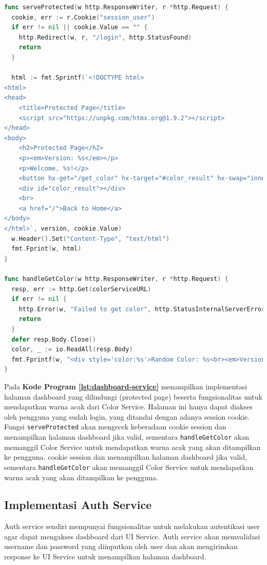 \begin{lstlisting}[language=go, 
  basicstyle=\footnotesize\ttfamily,
  caption={Implementasi Dashboard Service},
  label={lst:dashboard-service}]
func serveProtected(w http.ResponseWriter, r *http.Request) {
  cookie, err := r.Cookie("session_user")
  if err != nil || cookie.Value == "" {
    http.Redirect(w, r, "/login", http.StatusFound)
    return
  }

  html := fmt.Sprintf(`<!DOCTYPE html>
<html>
<head>
    <title>Protected Page</title>
    <script src="https://unpkg.com/htmx.org@1.9.2"></script>
</head>
<body>
    <h2>Protected Page</h2>
    <p><em>Version: %s</em></p>
    <p>Welcome, %s!</p>
    <button hx-get="/get_color" hx-target="#color_result" hx-swap="innerHTML">Get Random Color</button>
    <div id="color_result"></div>
    <br>
    <a href="/">Back to Home</a>
</body>
</html>`, version, cookie.Value)
  w.Header().Set("Content-Type", "text/html")
  fmt.Fprint(w, html)
}

func handleGetColor(w http.ResponseWriter, r *http.Request) {
  resp, err := http.Get(colorServiceURL)
  if err != nil {
    http.Error(w, "Failed to get color", http.StatusInternalServerError)
    return
  }
  defer resp.Body.Close()
  color, _ := io.ReadAll(resp.Body)
  fmt.Fprintf(w, "<div style='color:%s'>Random Color: %s<br><em>Version: %s</em></div>", color, color, version)
}
\end{lstlisting}

Pada \textbf{Kode Program \ref{lst:dashboard-service}} menampilkan implementasi
halaman dashboard yang dilindungi (protected page) beserta fungsionalitas untuk
mendapatkan warna acak dari Color Service. Halaman ini hanya dapat diakses oleh
pengguna yang sudah login, yang ditandai dengan adanya session cookie. Fungsi
\texttt{serveProtected} akan mengecek keberadaan cookie session dan menampilkan
halaman dashboard jika valid, sementara \texttt{handleGetColor} akan memanggil
Color Service untuk mendapatkan warna acak yang akan ditampilkan ke pengguna.
cookie session dan menampilkan halaman dashboard jika valid, sementara
\texttt{handleGetColor} akan memanggil Color Service untuk mendapatkan warna
acak yang akan ditampilkan ke pengguna.

\subsection{Implementasi Auth Service}
Auth service sendiri mempunyai fungsionalitas untuk melakukan autentikasi user
agar dapat mengakses dashboard dari UI Service. Auth service akan memvalidasi
username dan password yang diinputkan oleh user dan akan mengirimkan response
ke UI Service untuk menampilkan halaman dashboard.

